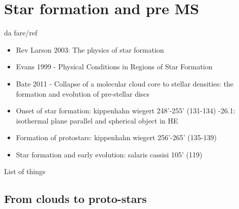 \section{Star formation and pre MS}

\begin{wordonframe}{da fare/ref}
\begin{itemize}
    \item Rev Larson 2003: The physics of star formation
    \item Evans 1999 - Physical Conditions in Regions of Star Formation
    \item Bate 2011 - Collapse of a molecular cloud core to stellar densities: the formation and evolution of pre-stellar discs
    \item Onset of star formation: kippenhahn wiegert 248'-255' (131-134) -26.1: isothermal plane parallel and spherical object in HE
    \item Formation of protostars: kippenhahn wiegert 256'-265' (135-139)
    \item Star formation and early evolution: salaris cassisi 105' (119)
\end{itemize}
\end{wordonframe}


\begin{frame}[allowframebreaks]{List of things}
\listoftodos
\end{frame}

\subsection{From clouds to proto-stars}

